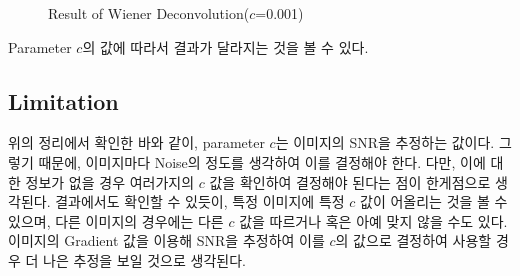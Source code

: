 \documentclass{report}
\begin{document}
\begin{figure}[htbp]
    \centering
    \hspace{1pt}
    \hspace{1pt}
    \hspace{1pt}
    \caption{Result of Wiener Deconvolution($c$=0.001)}
\end{figure}

Parameter $c$의 값에 따라서 결과가 달라지는 것을 볼 수 있다.

\subsection*{Limitation}

위의 정리에서 확인한 바와 같이, parameter $c$는 이미지의 SNR을 추정하는 값이다.
그렇기 때문에, 이미지마다 Noise의 정도를 생각하여 이를 결정해야 한다.
다만, 이에 대한 정보가 없을 경우 여러가지의 $c$ 값을 확인하여 결정해야 된다는 점이 한게점으로 생각된다.
결과에서도 확인할 수 있듯이, 특정 이미지에 특정 $c$ 값이 어올리는 것을 볼 수 있으며, 다른 이미지의 경우에는 다른 $c$ 값을 따르거나 혹은 아예 맞지 않을 수도 있다.
이미지의 Gradient 값을 이용해 SNR을 추정하여 이를 $c$의 값으로 결정하여 사용할 경우 더 나은 추정을 보일 것으로 생각된다.
\end{document}
